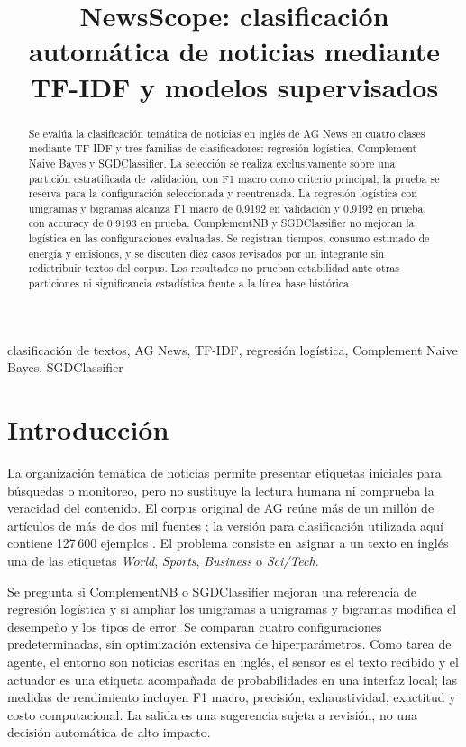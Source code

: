 \documentclass[conference]{IEEEtran}
\title{NewsScope: clasificación automática de noticias mediante TF-IDF y modelos supervisados}
\author{\IEEEauthorblockN{Autoría por confirmar}
\IEEEauthorblockA{Afiliación y datos de contacto por confirmar}}
\begin{document}
\maketitle

\begin{abstract}
Se evalúa la clasificación temática de noticias en inglés de AG News
en cuatro clases mediante TF-IDF y tres familias de clasificadores:
regresión logística, Complement Naive Bayes y SGDClassifier. La selección
se realiza exclusivamente sobre una partición estratificada de validación,
con F1 macro como criterio principal; la prueba se reserva para la
configuración seleccionada y reentrenada. La regresión logística con
unigramas y bigramas alcanza F1 macro de 0,9192 en validación y 0,9192
en prueba, con accuracy de 0,9193 en prueba. ComplementNB y SGDClassifier
no mejoran la logística en las configuraciones evaluadas. Se registran
tiempos, consumo estimado de energía y emisiones, y se discuten diez
casos revisados por un integrante sin redistribuir textos del corpus.
Los resultados no prueban estabilidad ante otras particiones ni
significancia estadística frente a la línea base histórica.
\end{abstract}
\begin{IEEEkeywords}
clasificación de textos, AG News, TF-IDF, regresión logística,
Complement Naive Bayes, SGDClassifier
\end{IEEEkeywords}

\section{Introducción}
La organización temática de noticias permite presentar etiquetas iniciales
para búsquedas o monitoreo, pero no sustituye la lectura humana ni comprueba
la veracidad del contenido. El corpus original de AG reúne más de un millón
de artículos de más de dos mil fuentes \cite{gulli}; la versión para
clasificación utilizada aquí contiene 127\,600 ejemplos \cite{agnews}.
El problema consiste en asignar a un texto en inglés una de las etiquetas
\emph{World}, \emph{Sports}, \emph{Business} o \emph{Sci/Tech}.

Se pregunta si ComplementNB o SGDClassifier mejoran una referencia de
regresión logística y si ampliar los unigramas a unigramas y bigramas
modifica el desempeño y los tipos de error. Se comparan cuatro
configuraciones predeterminadas, sin optimización extensiva de
hiperparámetros. Como tarea de agente, el entorno son noticias escritas
en inglés, el sensor es el texto recibido y el actuador es una etiqueta
acompañada de probabilidades en una interfaz local; las medidas de
rendimiento incluyen F1 macro, precisión, exhaustividad, exactitud y
costo computacional. La salida es una sugerencia sujeta a revisión,
no una decisión automática de alto impacto.
\end{document}
